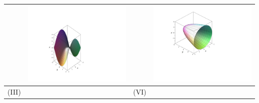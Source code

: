 \documentclass[12pt]{article}
\begin{document}
\begin{enumerate}
\begin{center}
\begin{tabular}{|lc|lc|}
&\includegraphics[scale=0.4]{matching5.pdf}&&\includegraphics[scale=0.4]{matching1.pdf}\\
\hline
(III) & & (VI)&\\

\end{tabular}
\end{center}
\end{enumerate}
\end{document}
